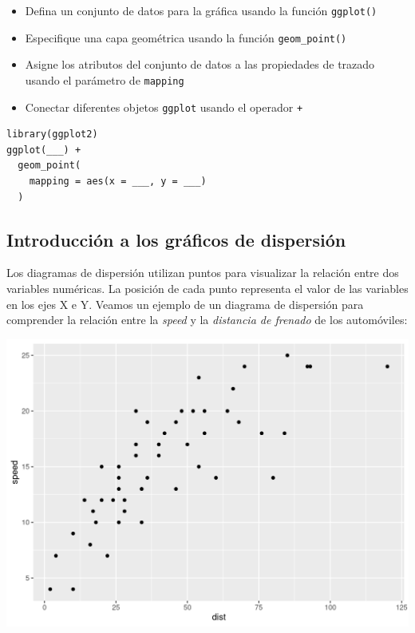 \documentclass[
]{book}
\providecommand{\tightlist}{%
  \setlength{\itemsep}{0pt}\setlength{\parskip}{0pt}}
\begin{document}
\begin{itemize}
\tightlist
\item
  Defina un conjunto de datos para la gráfica usando la función \texttt{ggplot()}
\item
  Especifique una capa geométrica usando la función \texttt{geom\_point()}
\item
  Asigne los atributos del conjunto de datos a las propiedades de trazado usando el parámetro de \texttt{mapping}
\item
  Conectar diferentes objetos \texttt{ggplot} usando el operador \texttt{+}
\end{itemize}

\begin{verbatim}
library(ggplot2)
ggplot(___) + 
  geom_point(
    mapping = aes(x = ___, y = ___)
  )
\end{verbatim}

\hypertarget{introducciuxf3n-a-los-gruxe1ficos-de-dispersiuxf3n}{%
\subsection{Introducción a los gráficos de dispersión}\label{introducciuxf3n-a-los-gruxe1ficos-de-dispersiuxf3n}}

Los diagramas de dispersión utilizan puntos para visualizar la relación entre dos variables numéricas. La posición de cada punto representa el valor de las variables en los ejes X e Y. Veamos un ejemplo de un diagrama de dispersión para comprender la relación entre la \emph{speed} y la \emph{distancia de frenado} de los automóviles:

\includegraphics{img/scat1.png}
\end{document}
